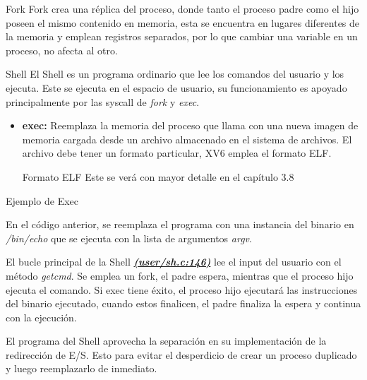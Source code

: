 \documentclass{libs/ufc_format}
\begin{document}
\begin{frame}{Fork}
  Fork crea una réplica del proceso, donde tanto el proceso padre como el hijo poseen el mismo contenido en memoria, esta se encuentra en lugares diferentes de la memoria y emplean registros separados, por lo que cambiar una variable en un proceso, no afecta al otro.
\end{frame}
\begin{frame}{Shell}
  El Shell es un programa ordinario que lee los comandos del usuario y los ejecuta. Este se ejecuta en el espacio de usuario, su funcionamiento es apoyado principalmente por las syscall de \textit{fork} y \textit{exec}.
  \begin{itemize}
    \item \textbf{exec:} Reemplaza la memoria del proceso que llama con una nueva imagen de memoria cargada desde un archivo almacenado en el sistema de archivos. El archivo debe tener un formato particular, XV6 emplea el formato ELF.
      \begin{block}{Formato ELF}
        Este se verá con mayor detalle en el capítulo 3.8
      \end{block}
  \end{itemize}
\end{frame}
\begin{frame}{Ejemplo de Exec}
  
\end{frame}
\begin{frame}
  En el código anterior, se reemplaza el programa con una instancia del binario en \textit{/bin/echo} que se ejecuta con la lista de argumentos \textit{argv}.

  \vspace{0.3cm}

  El bucle principal de la Shell \href{https://github.com/CarlosSandoval-03/xv6-riscv/blob/riscv/user/sh.c\#L146}{\textbf{\textit{(user/sh.c:146)}}} \cite{xv6} lee el input del usuario con el método \textit{getcmd}. Se emplea un fork, el padre espera, mientras que el proceso hijo ejecuta el comando. Si exec tiene éxito, el proceso hijo ejecutará las instrucciones del binario ejecutado, cuando estos finalicen, el padre finaliza la espera y continua con la ejecución.

  \vspace{0.3cm}

  El programa del Shell aprovecha la separación en su implementación de la redirección de E/S. Esto para evitar el desperdicio de crear un proceso duplicado y luego reemplazarlo de inmediato.
\end{frame}
\end{document}
